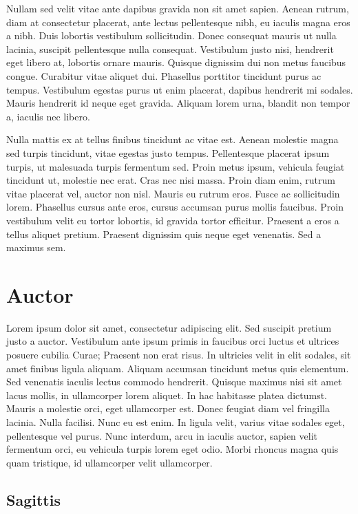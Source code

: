 Nullam sed velit vitae ante dapibus gravida non sit amet sapien. Aenean rutrum, diam at consectetur placerat, ante lectus pellentesque nibh, eu iaculis magna eros a nibh. Duis lobortis vestibulum sollicitudin. Donec consequat mauris ut nulla lacinia, suscipit pellentesque nulla consequat. Vestibulum justo nisi, hendrerit eget libero at, lobortis ornare mauris. Quisque dignissim dui non metus faucibus congue. Curabitur vitae aliquet dui. Phasellus porttitor tincidunt purus ac tempus. Vestibulum egestas purus ut enim placerat, dapibus hendrerit mi sodales. Mauris hendrerit id neque eget gravida. Aliquam lorem urna, blandit non tempor a, iaculis nec libero.

Nulla mattis ex at tellus finibus tincidunt ac vitae est. Aenean molestie magna sed turpis tincidunt, vitae egestas justo tempus. Pellentesque placerat ipsum turpis, ut malesuada turpis fermentum sed. Proin metus ipsum, vehicula feugiat tincidunt ut, molestie nec erat. Cras nec nisi massa. Proin diam enim, rutrum vitae placerat vel, auctor non nisl. Mauris eu rutrum eros. Fusce ac sollicitudin lorem. Phasellus cursus ante eros, cursus accumsan purus mollis faucibus. Proin vestibulum velit eu tortor lobortis, id gravida tortor efficitur. Praesent a eros a tellus aliquet pretium. Praesent dignissim quis neque eget venenatis. Sed a maximus sem.

\chapter{Auctor}

Lorem ipsum dolor sit amet, consectetur adipiscing elit. Sed suscipit pretium justo a auctor. Vestibulum ante ipsum primis in faucibus orci luctus et ultrices posuere cubilia Curae; Praesent non erat risus. In ultricies velit in elit sodales, sit amet finibus ligula aliquam. Aliquam accumsan tincidunt metus quis elementum. Sed venenatis iaculis lectus commodo hendrerit. Quisque maximus nisi sit amet lacus mollis, in ullamcorper lorem aliquet. In hac habitasse platea dictumst. Mauris a molestie orci, eget ullamcorper est. Donec feugiat diam vel fringilla lacinia. Nulla facilisi. Nunc eu est enim. In ligula velit, varius vitae sodales eget, pellentesque vel purus. Nunc interdum, arcu in iaculis auctor, sapien velit fermentum orci, eu vehicula turpis lorem eget odio. Morbi rhoncus magna quis quam tristique, id ullamcorper velit ullamcorper.

\section{Sagittis}

